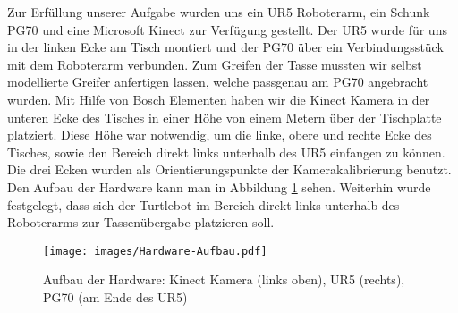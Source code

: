 Zur Erfüllung unserer Aufgabe wurden uns ein UR5 Roboterarm, ein Schunk PG70 und eine Microsoft Kinect zur Verfügung gestellt. Der UR5 wurde für uns in der linken Ecke am Tisch montiert und der PG70 über ein Verbindungsstück mit dem Roboterarm verbunden. Zum Greifen der Tasse mussten wir selbst modellierte Greifer anfertigen lassen, welche passgenau am PG70 angebracht wurden. Mit Hilfe von Bosch Elementen haben wir die Kinect Kamera in der unteren Ecke des Tisches in einer Höhe von einem Metern über der Tischplatte platziert. Diese Höhe war notwendig, um die linke, obere und rechte Ecke des Tisches, sowie den Bereich direkt links unterhalb des UR5 einfangen zu können. Die drei Ecken wurden als Orientierungspunkte der Kamerakalibrierung benutzt. Den Aufbau der Hardware kann man in Abbildung \ref{Hardware} sehen.
\newline
Weiterhin wurde festgelegt, dass sich der Turtlebot im Bereich direkt links unterhalb des Roboterarms zur Tassenübergabe platzieren soll.
\begin{figure}
	\centering
	\texttt{[image: images/Hardware-Aufbau.pdf]}
	\caption{Aufbau der Hardware: Kinect Kamera (links oben), UR5 (rechts), PG70 (am Ende des UR5)}
	\label{Hardware}
\end{figure}